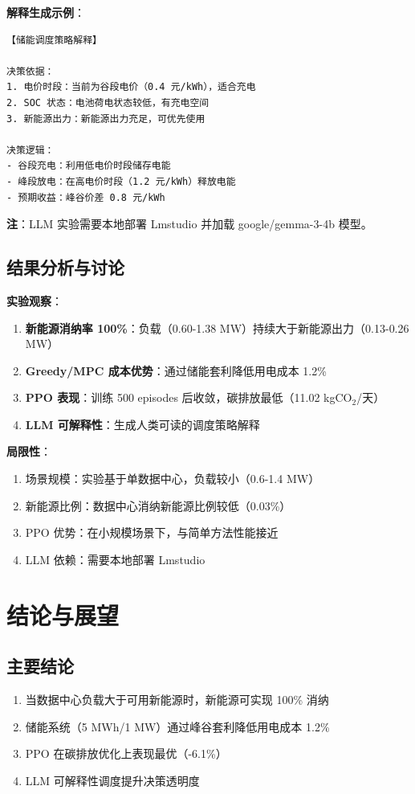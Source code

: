 \documentclass[12pt,a4paper]{article}
\begin{document}
\textbf{解释生成示例}：
\begin{verbatim}
【储能调度策略解释】

决策依据：
1. 电价时段：当前为谷段电价（0.4 元/kWh），适合充电
2. SOC 状态：电池荷电状态较低，有充电空间
3. 新能源出力：新能源出力充足，可优先使用

决策逻辑：
- 谷段充电：利用低电价时段储存电能
- 峰段放电：在高电价时段（1.2 元/kWh）释放电能
- 预期收益：峰谷价差 0.8 元/kWh
\end{verbatim}

\textbf{注}：LLM 实验需要本地部署 Lmstudio 并加载 google/gemma-3-4b 模型。

\subsection{结果分析与讨论}

\textbf{实验观察}：
\begin{enumerate}
    \item \textbf{新能源消纳率 100\%}：负载（0.60-1.38 MW）持续大于新能源出力（0.13-0.26 MW）
    \item \textbf{Greedy/MPC 成本优势}：通过储能套利降低用电成本 1.2\%
    \item \textbf{PPO 表现}：训练 500 episodes 后收敛，碳排放最低（11.02 kgCO$_2$/天）
    \item \textbf{LLM 可解释性}：生成人类可读的调度策略解释
\end{enumerate}

\textbf{局限性}：
\begin{enumerate}
    \item 场景规模：实验基于单数据中心，负载较小（0.6-1.4 MW）
    \item 新能源比例：数据中心消纳新能源比例较低（0.03\%）
    \item PPO 优势：在小规模场景下，与简单方法性能接近
    \item LLM 依赖：需要本地部署 Lmstudio
\end{enumerate}

\section{结论与展望}
\label{sec:conclusion}

\subsection{主要结论}

\begin{enumerate}
    \item 当数据中心负载大于可用新能源时，新能源可实现 100\% 消纳
    \item 储能系统（5 MWh/1 MW）通过峰谷套利降低用电成本 1.2\%
    \item PPO 在碳排放优化上表现最优（-6.1\%）
    \item LLM 可解释性调度提升决策透明度
\end{enumerate}
\end{document}
